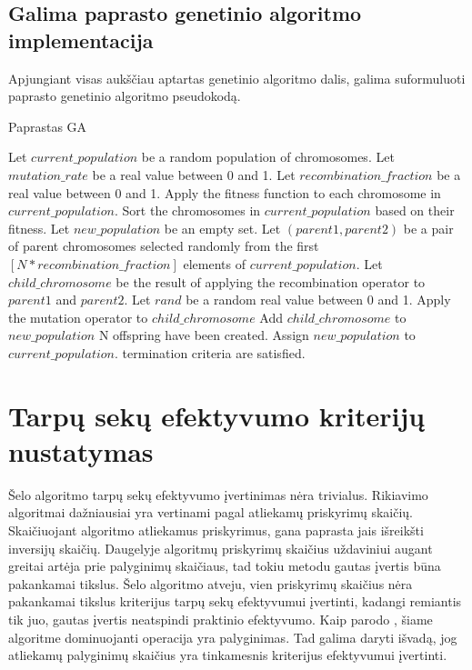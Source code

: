 \documentclass{VUMIFInfKursinis}
\begin{document}
\subsection{Galima paprasto genetinio algoritmo implementacija}

Apjungiant visas aukščiau aptartas genetinio algoritmo dalis, galima suformuluoti paprasto genetinio algoritmo pseudokodą.

\begin{algorithm}[H]
  \caption{Paprastas GA}\label{simple_GA}
  \begin{algorithmic}
    \State Let $current\_population$ be a random population of chromosomes.
    \State Let $mutation\_rate$ be a real value between 0 and 1.
    \State Let $recombination\_fraction$ be a real value between 0 and 1.
    \Repeat
      \State Apply the fitness function to each chromosome in $current\_population$.
      \State Sort the chromosomes in $current\_population$ based on their fitness.
      \State Let $new\_population$ be an empty set.
      \Repeat
        \State Let $(parent1, parent2)$ be a pair of parent chromosomes selected randomly from the first $[N * recombination\_fraction]$ elements of $current\_population$.
        \State Let $child\_chromosome$ be the result of applying the recombination operator to $parent1$ and $parent2$.
        \State Let $rand$ be a random real value between 0 and 1.
          \State Apply the mutation operator to $child\_chromosome$
        \EndIf
        \State Add $child\_chromosome$ to $new\_population$
      \Until N offspring have been created.
      \State Assign $new\_population$ to $current\_population$.
    \Until termination criteria are satisfied.
  \end{algorithmic}
\end{algorithm}

\section{Tarpų sekų efektyvumo kriterijų nustatymas}

Šelo algoritmo tarpų sekų efektyvumo įvertinimas nėra trivialus.
Rikiavimo algoritmai dažniausiai yra vertinami pagal atliekamų priskyrimų skaičių.
Skaičiuojant algoritmo atliekamus priskyrimus, gana paprasta jais išreikšti inversijų skaičių. %
Daugelyje algoritmų priskyrimų skaičius uždaviniui augant greitai artėja prie palyginimų skaičiaus,
tad tokiu metodu gautas įvertis būna pakankamai tikslus.
Šelo algoritmo atveju, vien priskyrimų skaičius nėra pakankamai tikslus kriterijus tarpų sekų efektyvumui įvertinti,
kadangi remiantis tik juo, gautas įvertis neatspindi praktinio efektyvumo.
Kaip parodo \cite{ciura2001best}, šiame algoritme dominuojanti operacija yra palyginimas.
Tad galima daryti išvadą, jog atliekamų palyginimų skaičius yra tinkamesnis kriterijus efektyvumui įvertinti.
\end{document}
